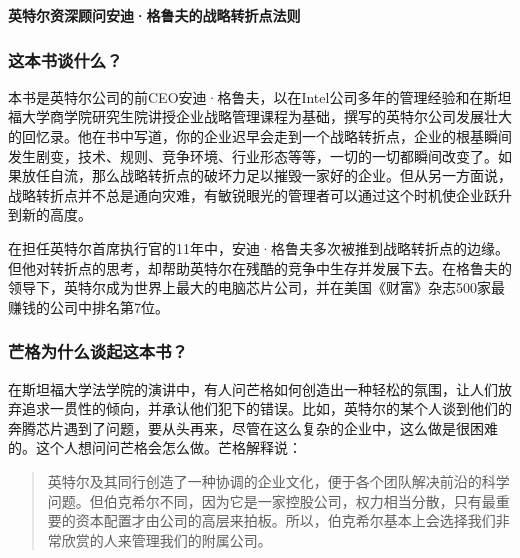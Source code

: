 \cleardoublepage
{}


\begin{BookSummaryBox}
\textbf{英特尔资深顾问安迪·格鲁夫的战略转折点法则}
\par
\end{BookSummaryBox}

\subsubsection*{这本书谈什么？}

本书是英特尔公司的前CEO安迪·格鲁夫，以在Intel公司多年的管理经验和在斯坦福大学商学院研究生院讲授企业战略管理课程为基础，撰写的英特尔公司发展壮大的回忆录。他在书中写道，你的企业迟早会走到一个战略转折点，企业的根基瞬间发生剧变，技术、规则、竞争环境、行业形态等等，一切的一切都瞬间改变了。如果放任自流，那么战略转折点的破坏力足以摧毁一家好的企业。但从另一方面说，战略转折点并不总是通向灾难，有敏锐眼光的管理者可以通过这个时机使企业跃升到新的高度。
\par

在担任英特尔首席执行官的11年中，安迪·格鲁夫多次被推到战略转折点的边缘。但他对转折点的思考，却帮助英特尔在残酷的竞争中生存并发展下去。在格鲁夫的领导下，英特尔成为世界上最大的电脑芯片公司，并在美国《财富》杂志500家最赚钱的公司中排名第7位。
\par

\subsubsection*{芒格为什么谈起这本书？}

在斯坦福大学法学院的演讲中，有人问芒格如何创造出一种轻松的氛围，让人们放弃追求一贯性的倾向，并承认他们犯下的错误。比如，英特尔的某个人谈到他们的奔腾芯片遇到了问题，要从头再来，尽管在这么复杂的企业中，这么做是很困难的。这个人想问问芒格会怎么做。芒格解释说：
\par

\begin{quotation}
英特尔及其同行创造了一种协调的企业文化，便于各个团队解决前沿的科学问题。但伯克希尔不同，因为它是一家控股公司，权力相当分散，只有最重要的资本配置才由公司的高层来拍板。所以，伯克希尔基本上会选择我们非常欣赏的人来管理我们的附属公司。
\par
\end{quotation}

